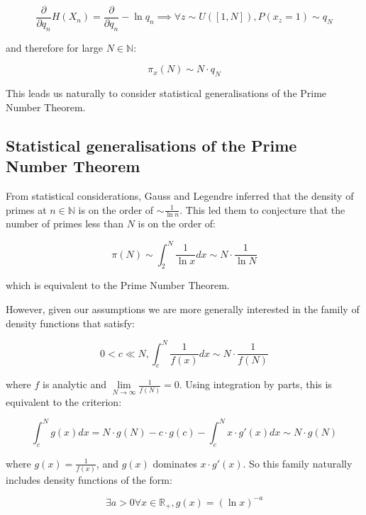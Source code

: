 \documentclass{article}
\begin{document}
\begin{equation}
\frac{\partial}{\partial q_n} H(X_n) = \frac{\partial}{\partial q_n} -\ln q_n \implies \forall z \sim U([1,N]), P(x_z = 1) \sim q_N
\end{equation} 

and therefore for large $N \in \mathbb{N}$:

\begin{equation}
\pi_x(N) \sim N \cdot q_N 	
\end{equation} 

This leads us naturally to consider statistical generalisations of the Prime Number Theorem. 

\subsection{Statistical generalisations of the Prime Number Theorem}

From statistical considerations, Gauss and Legendre inferred that the density of primes at $n \in \mathbb{N}$ is on the order of $\sim \frac{1}{\ln n}$. This led them to conjecture that the number of primes less than $N$ is on the order of:

\begin{equation}
\pi(N) \sim \int_{2}^N \frac{1}{\ln x} dx \sim N \cdot \frac{1}{\ln N}
\end{equation}

which is equivalent to the Prime Number Theorem.

However, given our assumptions we are more generally interested in the family of density functions that satisfy:  

\begin{equation}
0 < c \ll N, \int_{c}^N \frac{1}{f(x)} dx \sim N \cdot \frac{1}{f(N)}
\end{equation}

where $f$ is analytic and $\lim\limits_{N \to \infty} \frac{1}{f(N)}=0$. Using integration by parts, this is equivalent to the criterion:

\begin{equation}
\int_{c}^N g(x) dx = N \cdot g(N) - c \cdot g(c) - \int_{c}^N x \cdot g'(x) dx \sim N \cdot g(N)
\end{equation}

where $g(x)=\frac{1}{f(x)}$, and $g(x)$ dominates $x \cdot g'(x)$.
So this family naturally includes density functions of the form:

\begin{equation}
\exists a > 0 \forall x \in \mathbb{R}_+, g(x) = (\ln x)^{-a}
\end{equation}
\end{document}
